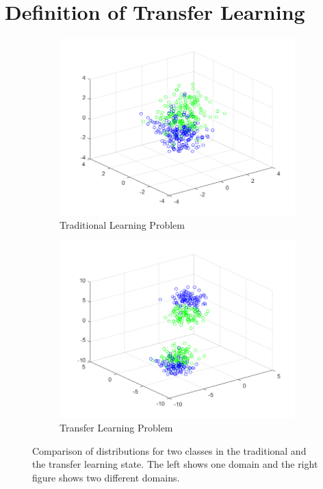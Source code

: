 \section{Definition of Transfer Learning}\label{TlSecDef}
\begin{figure}
	\centering
	\begin{subfigure}{.5\textwidth}
		\centering
		\includegraphics[width=1\linewidth]{figures/TraditionalProblem.png}
		\caption{Traditional Learning Problem\label{FigTradProblem}}
	\end{subfigure}%
	\begin{subfigure}{.5\textwidth}
		\centering
		\includegraphics[width=1\linewidth]{figures/TransferProblem.png}
		\caption{Transfer Learning Problem \label{FigTLProblem}}
	\end{subfigure}
	\caption[Comparison of Transfer and Traditional Learning Problem]{Comparison of distributions for two classes in the traditional and the transfer learning state. The left shows one domain and the right figure shows two different domains.\label{FigProblemComparison}}
\end{figure}
